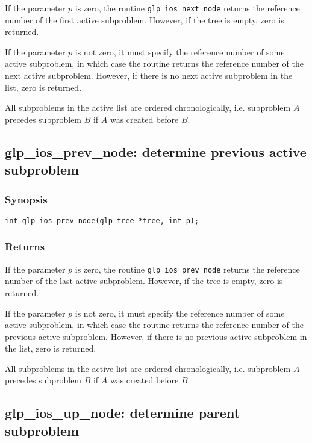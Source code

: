 If the parameter $p$ is zero, the routine \verb|glp_ios_next_node|
returns the reference number of the first active subproblem. However,
if the tree is empty, zero is returned.

If the parameter $p$ is not zero, it must specify the reference number
of some active subproblem, in which case the routine returns the
reference number of the next active subproblem. However, if there is
no next active subproblem in the list, zero is returned.

All subproblems in the active list are ordered chronologically, i.e.
subproblem $A$ precedes subproblem $B$ if $A$ was created before $B$.

\subsection{glp\_ios\_prev\_node: determine previous active subproblem}

\subsubsection*{Synopsis}

\begin{verbatim}
int glp_ios_prev_node(glp_tree *tree, int p);
\end{verbatim}

\subsubsection*{Returns}

If the parameter $p$ is zero, the routine \verb|glp_ios_prev_node|
returns the reference number of the last active subproblem. However, if
the tree is empty, zero is returned.

If the parameter $p$ is not zero, it must specify the reference number
of some active subproblem, in which case the routine returns the
reference number of the previous active subproblem. However, if there
is no previous active subproblem in the list, zero is returned.

All subproblems in the active list are ordered chronologically, i.e.
subproblem $A$ precedes subproblem $B$ if $A$ was created before $B$.

\newpage

\subsection{glp\_ios\_up\_node: determine parent subproblem}

